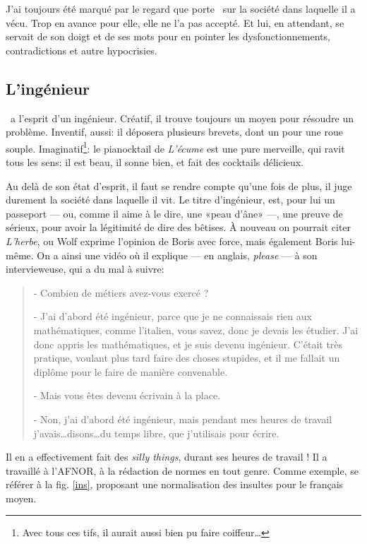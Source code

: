 J'ai toujours été marqué par le regard que porte \BV\ sur la société
dans laquelle il a vécu. Trop en avance pour elle, elle ne l'a pas accepté. Et
lui, en attendant, se servait de son doigt et de ses mots pour en pointer
les dysfonctionnements, contradictions et autre hypocrisies.

\subsection{L'ingénieur}

\BV\ a l'esprit d'un ingénieur. Créatif, il trouve toujours
un moyen pour résoudre un problème. Inventif, aussi: il déposera
plusieurs brevets, dont un pour une roue souple. Imaginatif\footnote{Avec tous ces tifs,
il aurait aussi bien pu faire coiffeur\ldots}: le pianocktail de \emph{L'écume}
est une pure merveille, qui ravit tous les sens: il est beau, il sonne bien,
et fait des cocktails délicieux.

Au delà de son état d'esprit, il faut se rendre compte qu'une fois de plus,
il juge durement la société dans laquelle il vit. Le titre d'ingénieur, est,
pour lui un passeport --- ou, comme il aime à le dire, une «peau d'âne» ---, une
preuve de sérieux, pour avoir la légitimité de dire des bêtises. À nouveau on pourrait
citer \emph{L'herbe}, ou Wolf exprime l'opinion de Boris avec force, mais également
Boris lui-même. On a ainsi une vidéo où il explique --- en anglais, \emph{please} ---
à son intervieweuse, qui a du mal à suivre:

{\small
\begin{quotation}
- Combien de métiers avez-vous exercé ?

- J'ai d'abord été ingénieur, parce que je ne connaissais rien aux
mathématiques, comme l'italien, vous savez, donc je devais les étudier.
J'ai donc appris les mathématiques, et je suis devenu ingénieur.
C'était très pratique, voulant plus tard faire des choses stupides,
et il me fallait un diplôme pour le faire de manière convenable.

- Mais vous êtes devenu écrivain à la place.

- Non, j'ai d'abord été ingénieur, mais pendant mes heures de travail
j'avais\ldots disons\ldots du temps libre, que j'utilisais pour écrire.
\end{quotation}
}

Il en a effectivement fait des \emph{silly things}, durant ses heures de travail ! Il a
travaillé à l'AFNOR, à la rédaction de normes en tout genre. Comme exemple, se
référer à la fig. \ref{ins}, proposant une normalisation des insultes pour le français moyen.

